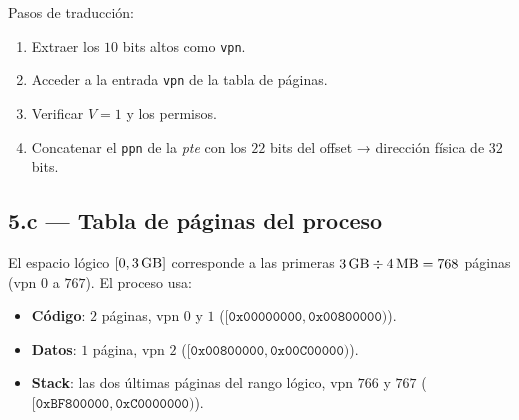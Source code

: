 \documentclass[11pt,a4paper]{article}
\begin{document}
\begin{center}
\end{center}

Pasos de traducción:
\begin{enumerate}[leftmargin=*,nosep]
    \item Extraer los $10$ bits altos como \texttt{vpn}.
    \item Acceder a la entrada \texttt{vpn} de la tabla de páginas.
    \item Verificar $V=1$ y los permisos.
    \item Concatenar el \texttt{ppn} de la \emph{pte} con los $22$
        bits del offset → dirección física de $32$ bits.
\end{enumerate}

\subsection{5.c --- Tabla de páginas del proceso}

El espacio lógico $[0, 3\text{\,GB}]$ corresponde a las primeras
$3\text{\,GB} \div 4\text{\,MB} = 768$ páginas (vpn $0$ a $767$). El
proceso usa:

\begin{itemize}[leftmargin=*,nosep]
    \item \textbf{Código}: $2$ páginas, vpn $0$ y $1$
        ($[\texttt{0x00000000}, \texttt{0x00800000})$).
    \item \textbf{Datos}: $1$ página, vpn $2$
        ($[\texttt{0x00800000}, \texttt{0x00C00000})$).
    \item \textbf{Stack}: las dos últimas páginas del rango lógico,
        vpn $766$ y $767$ ($[\texttt{0xBF800000}, \texttt{0xC0000000})$).
\end{itemize}
\end{document}

